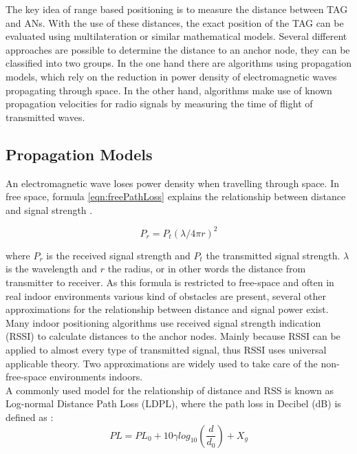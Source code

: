 The key idea of range based positioning is to measure the distance between TAG and ANs. With the use of these distances, the exact position of the TAG can be evaluated using multilateration or similar mathematical models. Several different approaches are possible to determine the distance to an anchor node, they can be classified into two groups. In the one hand there are algorithms using propagation models, which rely on the reduction in power density of electromagnetic waves propagating through space. In the other hand, algorithms make use of known propagation velocities for radio signals  by measuring the time of flight of transmitted waves. 

\subsection{Propagation Models}
An electromagnetic wave loses power density when travelling through space. In free space, formula \ref{eqn:freePathLoss} explains the relationship between distance and signal strength \cite{VorlesungCN}.

\begin{equation}
P_{r} = P_{t} (\lambda/4\pi r)^2
\label{eqn:freePathLoss}
\end{equation}

where $P_{r}$ is the received signal strength and $P_{t}$ the transmitted signal strength. $\lambda$ is the wavelength and $r$ the radius, or in other words the distance from transmitter to receiver. As this formula is restricted to free-space and often in real indoor environments various kind of obstacles are present, several other approximations for the relationship between distance and signal power exist. Many indoor positioning algorithms use received signal strength indication (RSSI) to calculate distances to the anchor nodes. Mainly because RSSI can be applied to almost every type of transmitted signal, thus RSSI uses universal applicable theory. Two approximations are widely used to take care of the non-free-space environments indoors.\\
\noindent\hspace*{5mm}%
A commonly used model for the relationship of distance and RSS is known as Log-normal Distance Path Loss (LDPL), where the path loss in Decibel (dB) is defined as \cite{Sarkar}:
\begin{equation}
PL = PL_{0} +10 \gamma log_{10} (\frac{d}{d_{0}}) + X_{g}
\label{eqn:LDPL}
\end{equation}

